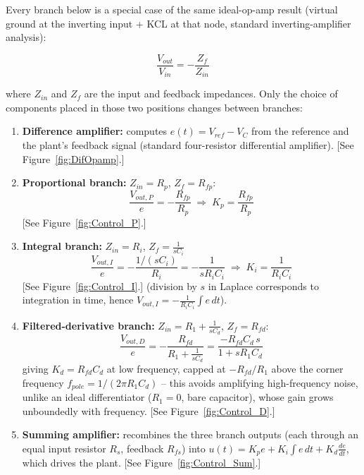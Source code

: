 \documentclass[11pt,letterpaper]{article}
\begin{document}
Every branch below is a special case of the same ideal-op-amp result (virtual ground at the inverting
input + KCL at that node, standard inverting-amplifier analysis):

\begin{tcolorbox}[colback=blue!5,colframe=blue!40!black,arc=1mm]
\begin{equation}
\frac{V_{out}}{V_{in}} = -\frac{Z_f}{Z_{in}}
\end{equation}
\end{tcolorbox}

where $Z_{in}$ and $Z_f$ are the input and feedback impedances. Only the choice of components placed in
those two positions changes between branches:

\begin{enumerate}[nosep]
    \item \textbf{Difference amplifier:} computes $e(t)=V_{ref}-V_C$ from the reference and the plant's
    feedback signal (standard four-resistor differential amplifier).
    [See Figure~\ref{fig:DifOpamp}.]
    \item \textbf{Proportional branch:} $Z_{in}=R_p$, $Z_f=R_{fp}$:
    \begin{equation}
    \frac{V_{out,P}}{e} = -\frac{R_{fp}}{R_p} \;\Rightarrow\; K_p=\frac{R_{fp}}{R_p}
    \end{equation}
    [See Figure~\ref{fig:Control_P}.]
    \item \textbf{Integral branch:} $Z_{in}=R_i$, $Z_f=\frac{1}{sC_i}$ 
    \begin{equation}
    \frac{V_{out,I}}{e} = -\frac{1/(sC_i)}{R_i} = -\frac{1}{sR_iC_i} \;\Rightarrow\; K_i=\frac{1}{R_iC_i}
    \end{equation}
    [See Figure~\ref{fig:Control_I}.]
    (division by $s$ in Laplace corresponds to integration in time, hence $V_{out,I}=-\frac{1}{R_iC_i}\int e\,dt$).
    \item \textbf{Filtered-derivative branch:} $Z_{in}=R_1+\frac{1}{sC_d}$, $Z_f=R_{fd}$:
    \begin{equation}
    \frac{V_{out,D}}{e} = -\frac{R_{fd}}{R_1+\frac{1}{sC_d}} = \frac{-R_{fd}C_d\,s}{1+sR_1C_d}
    \end{equation}
    giving $K_d=R_{fd}C_d$ at low frequency, capped at $-R_{fd}/R_1$ above the corner frequency
    $f_{pole}=1/(2\pi R_1 C_d)$ -- this avoids amplifying high-frequency noise, unlike an ideal
    differentiator ($R_1=0$, bare capacitor), whose gain grows unboundedly with frequency.
    [See Figure~\ref{fig:Control_D}.]
    \item \textbf{Summing amplifier:} recombines the three branch outputs (each through an equal input
    resistor $R_s$, feedback $R_{fs}$) into $u(t)=K_pe+K_i\int e\,dt+K_d\frac{de}{dt}$, which drives the
    plant.
    [See Figure~\ref{fig:Control_Sum}.]
\end{enumerate}
\end{document}
